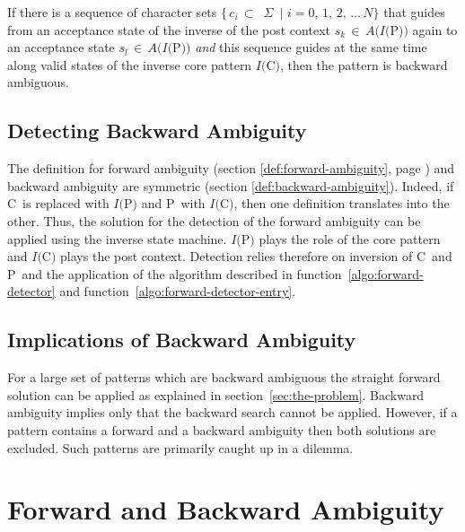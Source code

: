 \documentclass[acmtoplas]{acmtrans2m}
\newcommand{\secref}[1]{section~\ref{sec:#1}}
\newcommand{\funcref}[1]{function~\ref{algo:#1}}
\newcommand{\finv}[1]{$I(${\sf #1}$)$}
\newcommand{\pP}{{\sf P}}
\newcommand{\pC}{{\sf C}}
\begin{document}
\begin{samepage}
\begin{definition} \label{def:backward-ambiguity}
If there is a sequence of character sets\linebreak
$\{\, c_i\,\subset$~$\Sigma$~$|$ $i=0,\,1,\,2,\,\ldots \,N\}$
that guides from an acceptance state of the inverse of the post context $s_k\,\in\,A(I($\pP$))$
again to an acceptance state $s_l\,\in\,A(I($\pP$))$
{\it and} this sequence guides at the same time along valid
states of the inverse core pattern $I($\pC$)$, then the pattern is backward ambiguous. 
\end{definition}
\end{samepage}

\subsection{Detecting Backward Ambiguity}

The definition for forward ambiguity (section \ref{def:forward-ambiguity}, page \pageref{def:forward-ambiguity})
and backward ambiguity are symmetric (section \ref{def:backward-ambiguity}). Indeed, if
\pC\ is replaced with \finv{P} and \pP\ with \finv{C}, then
one definition translates into the other. Thus, the solution for the detection of the
forward ambiguity can be applied using the inverse state machine. \finv{P} plays the
role of the core pattern and \finv{C} plays the post context. 
Detection relies therefore on inversion of \pC\ and \pP\ and the
application of the algorithm described in \funcref{forward-detector} 
and \funcref{forward-detector-entry}.

\subsection{Implications of Backward Ambiguity}

For a large set of patterns which are backward ambiguous the straight forward
solution can be applied as explained in \secref{the-problem}. Backward ambiguity 
implies only that the backward search cannot be applied. However, if a
pattern contains a forward and a backward ambiguity then both solutions
are excluded. Such patterns are primarily caught up in a dilemma.

\section{Forward and Backward Ambiguity}
\label{sec:forward-and-backward-ambiguity}
\end{document}
